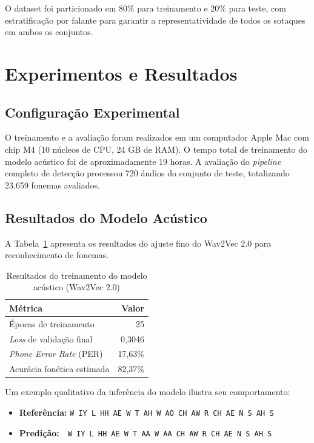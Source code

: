 \documentclass[12pt]{article}
\begin{document}
O dataset foi particionado em 80\% para treinamento e 20\% para teste, com estratificação por falante para garantir a representatividade de todos os sotaques em ambos os conjuntos.


\section{Experimentos e Resultados} \label{sec:experimentos}

\subsection{Configuração Experimental}

O treinamento e a avaliação foram realizados em um computador Apple Mac com chip M4 (10 núcleos de CPU, 24 GB de RAM). O tempo total de treinamento do modelo acústico foi de aproximadamente 19 horas. A avaliação do \textit{pipeline} completo de detecção processou 720 áudios do conjunto de teste, totalizando 23.659 fonemas avaliados.

\subsection{Resultados do Modelo Acústico}

A Tabela~\ref{tab:treino} apresenta os resultados do ajuste fino do Wav2Vec 2.0 para reconhecimento de fonemas.

\begin{table}[H]
\centering
\caption{Resultados do treinamento do modelo acústico (Wav2Vec 2.0)}
\label{tab:treino}
\begin{tabular}{@{}lr@{}}
\toprule
\textbf{Métrica} & \textbf{Valor} \\
\midrule
Épocas de treinamento & 25 \\
\textit{Loss} de validação final & 0,3046 \\
\textit{Phone Error Rate} (PER) & 17,63\% \\
Acurácia fonética estimada & 82,37\% \\
\bottomrule
\end{tabular}
\end{table}

Um exemplo qualitativo da inferência do modelo ilustra seu comportamento:

\begin{itemize}
    \item \textbf{Referência:} \texttt{W IY L HH AE W T AH W AO CH AW R CH AE N S AH S}
    \item \textbf{Predição:}~~\texttt{W IY L HH AE W T AA W AA CH AW R CH AE N S AH S}
\end{itemize}
\end{document}
